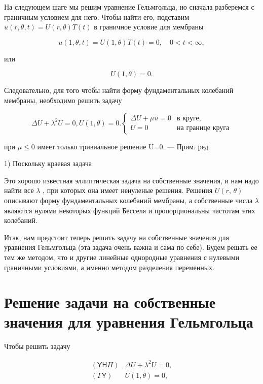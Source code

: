 \documentclass[
  ukrainian,
]{article}
\begin{document}
На следующем шаге мы решим уравнение Гельмгольца, но сначала разберемся
с граничным условием для него. Чтобы найти его, подставим
\(u(r, \theta, t) = U(r, \theta) T(t)\) в граничное условие для мембраны

\[
u(1, \theta, t) = U(1, \theta) T(t) = 0, \quad 0 < t < \infty,
\]

или

\[
U(1, \theta) = 0.
\]

Следовательно, для того чтобы найти форму фундаментальных колебаний
мембраны, необходимо решить задачу

\[
\Delta U + \lambda^2 U = 0,
U(1, \theta) = 0.
\begin{cases} \Delta U + \mu u = 0 & \text{в круге,} \\ U = 0 & \text{на границе круга} \end{cases}
\]

при \(\mu \le 0\) имеет только тривиальное решение U=0. --- Прим. ред.

1) Поскольку краевая задача

Это хорошо известная эллиптическая задача на собственные значения, и нам
надо найти все \(\lambda\) , при которых она имеет ненуленые решения.
Решения \(U\left(r,\,\theta\right)\) описывают форму фундаментальных
колебаний мембраны, а собственные числа \(\lambda\) являются нулями
некоторых функций Бесселя и пропорциональны частотам этих колебаний.

Итак, нам предстоит теперь решить задачу на собственные значения для
уравнения Гельмгольца (эта задача очень важна и сама по себе). Будем
решать ее тем же методом, что и другие линейные однородные уравнения с
нулевыми граничными условиями, а именно методом разделения переменных.

\section{Решение задачи на собственные значения для уравнения
Гельмгольца}\label{ux440ux435ux448ux435ux43dux438ux435-ux437ux430ux434ux430ux447ux438-ux43dux430-ux441ux43eux431ux441ux442ux432ux435ux43dux43dux44bux435-ux437ux43dux430ux447ux435ux43dux438ux44f-ux434ux43bux44f-ux443ux440ux430ux432ux43dux435ux43dux438ux44f-ux433ux435ux43bux44cux43cux433ux43eux43bux44cux446ux430}

Чтобы решить задачу

\[
\begin{array}{llll} (\mathsf{Y}\mathsf{H}\mathsf{\Pi}) & \Delta U + \lambda^2 U = 0, \\ (\mathsf{\Gamma}\mathsf{Y}) & U(1, \theta) = 0, \end{array}
\]
\end{document}
